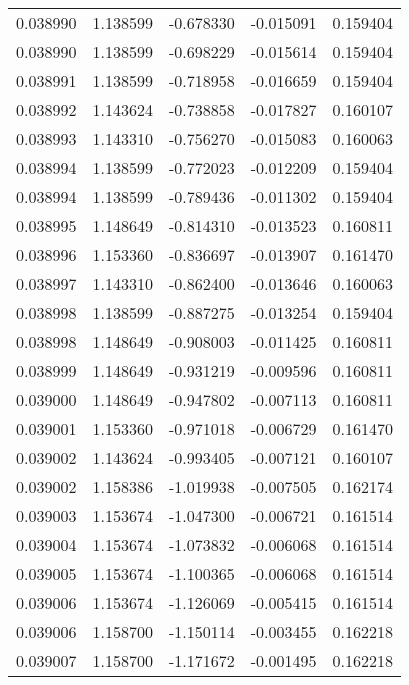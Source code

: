 \begin{tabular}{lrrrr}
0.038990    &  1.138599 & -0.678330 & -0.015091 &             0.159404 \\
0.038990    &  1.138599 & -0.698229 & -0.015614 &             0.159404 \\
0.038991    &  1.138599 & -0.718958 & -0.016659 &             0.159404 \\
0.038992    &  1.143624 & -0.738858 & -0.017827 &             0.160107 \\
0.038993    &  1.143310 & -0.756270 & -0.015083 &             0.160063 \\
0.038994    &  1.138599 & -0.772023 & -0.012209 &             0.159404 \\
0.038994    &  1.138599 & -0.789436 & -0.011302 &             0.159404 \\
0.038995    &  1.148649 & -0.814310 & -0.013523 &             0.160811 \\
0.038996    &  1.153360 & -0.836697 & -0.013907 &             0.161470 \\
0.038997    &  1.143310 & -0.862400 & -0.013646 &             0.160063 \\
0.038998    &  1.138599 & -0.887275 & -0.013254 &             0.159404 \\
0.038998    &  1.148649 & -0.908003 & -0.011425 &             0.160811 \\
0.038999    &  1.148649 & -0.931219 & -0.009596 &             0.160811 \\
0.039000    &  1.148649 & -0.947802 & -0.007113 &             0.160811 \\
0.039001    &  1.153360 & -0.971018 & -0.006729 &             0.161470 \\
0.039002    &  1.143624 & -0.993405 & -0.007121 &             0.160107 \\
0.039002    &  1.158386 & -1.019938 & -0.007505 &             0.162174 \\
0.039003    &  1.153674 & -1.047300 & -0.006721 &             0.161514 \\
0.039004    &  1.153674 & -1.073832 & -0.006068 &             0.161514 \\
0.039005    &  1.153674 & -1.100365 & -0.006068 &             0.161514 \\
0.039006    &  1.153674 & -1.126069 & -0.005415 &             0.161514 \\
0.039006    &  1.158700 & -1.150114 & -0.003455 &             0.162218 \\
0.039007    &  1.158700 & -1.171672 & -0.001495 &             0.162218 \\

\end{tabular}
